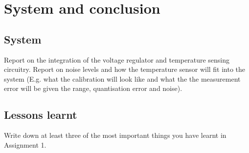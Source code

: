 \chapter{System and conclusion}
\vspace{-5mm}
\section{System}
Report on the integration of the voltage regulator and temperature sensing circuitry. 
Report on noise levels and how the temperature sensor will fit into the system (E.g. what the calibration will look like and what the the measurement error will be given the range, quantisation error and noise). 

\section{Lessons learnt}
Write down at least three of the most important things you have learnt in Assignment 1.
